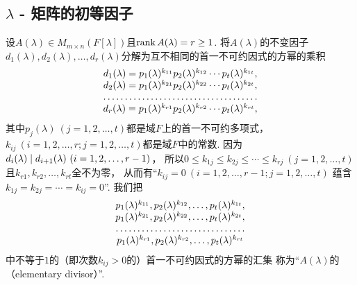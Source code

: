 \subsection{\texorpdfstring{$\lambda$}{\textlambda} - 矩阵的初等因子}
设\(A(\lambda) \in M_{m \times n}(F[\lambda])\)且\(\rank A(\lambda) = r \geq 1\).
将\(A(\lambda)\)的不变因子\(
	d_1(\lambda),
	d_2(\lambda),
	\dotsc,
	d_r(\lambda)
\)分解为互不相同的首一不可约因式的方幂的乘积\begin{equation*}
	\begin{array}{c}
		d_1(\lambda) = p_1(\lambda)^{k_{11}} p_2(\lambda)^{k_{12}} \dotsm p_t(\lambda)^{k_{1t}}, \\
		d_2(\lambda) = p_1(\lambda)^{k_{21}} p_2(\lambda)^{k_{22}} \dotsm p_t(\lambda)^{k_{2t}}, \\
		\hdotsfor{1} \\
		d_r(\lambda) = p_1(\lambda)^{k_{r1}} p_2(\lambda)^{k_{r2}} \dotsm p_t(\lambda)^{k_{rt}},
	\end{array}
\end{equation*}
其中\(p_j(\lambda)\ (j=1,2,\dotsc,t)\)都是域\(F\)上的首一不可约多项式，
\(k_{ij}\ (i=1,2,\dotsc,r;j=1,2,\dotsc,t)\)都是域\(F\)中的常数.
因为\(
	\ExactlyDividedBy{ d_{i+1}(\lambda) }{ d_i(\lambda) }  %
	\ (i=1,2,\dotsc,r-1)
\)，
所以\(
	0 \leq k_{1j} \leq k_{2j} \leq \dotsb \leq k_{rj}
	\ (j=1,2,\dotsc,t)
\)
且\(
	k_{r1},
	k_{r2},
	\dotsc,
	k_{rt}
\)全不为零，
从而有“\(k_{ij} = 0\ (i=1,2,\dotsc,r-1;j=1,2,\dotsc,t)\)
蕴含\(k_{1j} = k_{2j} = \dotsb = k_{ij} = 0\)”.
我们把\begin{equation*}
	\begin{array}{c}
		p_1(\lambda)^{k_{11}},
		p_2(\lambda)^{k_{12}},
		\dotsc,
		p_t(\lambda)^{k_{1t}}, \\
		p_1(\lambda)^{k_{21}},
		p_2(\lambda)^{k_{22}},
		\dotsc,
		p_t(\lambda)^{k_{2t}}, \\
		\hdotsfor{1} \\
		p_1(\lambda)^{k_{r1}},
		p_2(\lambda)^{k_{r2}},
		\dotsc,
		p_t(\lambda)^{k_{rt}}
	\end{array}
\end{equation*}
中不等于\(1\)的（即次数\(k_{ij} > 0\)的）首一不可约因式的方幂的汇集
称为“\(A(\lambda)\)的（elementary divisor）”.

